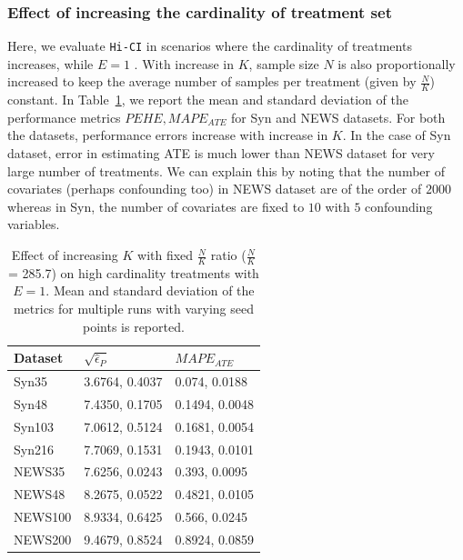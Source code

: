 \documentclass[twoside,11pt]{article}
\begin{document}
\subsubsection{Effect of increasing the cardinality of treatment set}
Here, we evaluate \texttt{Hi-CI} in scenarios where the cardinality of treatments increases, while $E = 1$ . With increase in $K$, sample size $N$ is also proportionally increased to keep the average number of samples per treatment (given by $\frac{N}{K}$) constant. In Table~\ref{tab:exp2_fixed_n_k_ratio}, we report the mean and standard deviation of the performance metrics $PEHE, MAPE_{ATE}$ for \textsf{Syn} and \textsf{NEWS} datasets. For both the datasets, performance errors increase with increase in $K$. In the case of \textsf{Syn} dataset, error in estimating ATE is much lower than \textsf{NEWS} dataset for very large number of treatments. We can explain this by noting that the number of covariates (perhaps confounding too) in  \textsf{NEWS} dataset are of the order of $2000$ whereas in \textsf{Syn}, the number of covariates are fixed to $10$ with $5$ confounding variables.
\begin{table}
\centering
\caption{Effect of increasing $K$ with fixed $\tfrac{N}{K}$ ratio ($\tfrac{N}{K}$ = 285.7) on high cardinality treatments with $E=1$. Mean and standard deviation of the metrics for multiple runs with varying seed points is reported.}
\label{tab:exp2_fixed_n_k_ratio}  
  \begin{tabular}{l|l|l}
    \hline
    Dataset & $\sqrt{\hat\epsilon_{P}}$ & $MAPE_{ATE}$\\
    \hline
    \textsf{Syn35} & 3.6764, 0.4037 & 0.074, 0.0188\\
    \textsf{Syn48} & 7.4350, 0.1705 & 0.1494, 0.0048\\
    \textsf{Syn103} & 7.0612, 0.5124 & 0.1681, 0.0054\\
    \textsf{Syn216} & 7.7069, 0.1531 & 0.1943, 0.0101\\
    \textsf{NEWS35} & 7.6256, 0.0243 & 0.393, 0.0095\\
    \textsf{NEWS48} & 8.2675, 0.0522 & 0.4821, 0.0105\\
    \textsf{NEWS100} & 8.9334, 0.6425 & 0.566, 0.0245\\
    \textsf{NEWS200} & 9.4679, 0.8524 & 0.8924, 0.0859\\
    \hline
\end{tabular}
\end{table}
\end{document}
